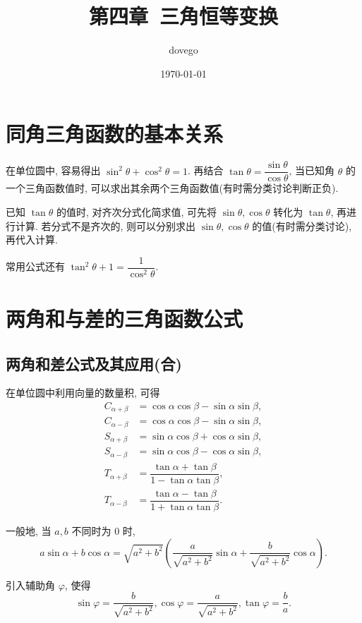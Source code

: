 \documentclass[titlepage]{ctexart}
\title{第四章~三角恒等变换}
\author{dovego}
\date{\today}
\begin{document}
\maketitle


\section{同角三角函数的基本关系}

在单位圆中, 容易得出 $\sin^2 \theta + \cos^2 \theta = 1$.
再结合 $\tan \theta = \dfrac{\sin \theta}{\cos \theta}$,
当已知角 $\theta$ 的一个三角函数值时, 可以求出其余两个三角函数值(有时需分类讨论判断正负).

已知 $\tan \theta$ 的值时, 对齐次分式化简求值, 可先将 $\sin \theta, \cos \theta$ 转化为 $\tan \theta$, 再进行计算.
若分式不是齐次的, 则可以分别求出 $\sin \theta, \cos \theta$ 的值(有时需分类讨论), 再代入计算.

常用公式还有 $\tan^2 \theta + 1 = \dfrac{1}{\cos^2 \theta}$.


\section{两角和与差的三角函数公式}

\subsection{两角和差公式及其应用(合)}
在单位圆中利用向量的数量积, 可得
\begin{align*}
C_{\alpha + \beta} &= \cos \alpha \cos \beta - \sin \alpha \sin \beta, \\
C_{\alpha - \beta} &= \cos \alpha \cos \beta - \sin \alpha \sin \beta, \\
S_{\alpha + \beta} &= \sin \alpha \cos \beta + \cos \alpha \sin \beta, \\
S_{\alpha - \beta} &= \sin \alpha \cos \beta - \cos \alpha \sin \beta, \\
T_{\alpha + \beta} &= \dfrac{\tan \alpha + \tan \beta}{1 - \tan \alpha \tan \beta}, \\
T_{\alpha - \beta} &= \dfrac{\tan \alpha - \tan \beta}{1 + \tan \alpha \tan \beta}.
\end{align*}

一般地, 当 $a, b$ 不同时为 0 时, 
\[
a\sin \alpha + b\cos \alpha = \sqrt{a^2 + b^2}(\frac{a}{\sqrt{a^2 + b^2}}\sin \alpha 
                                    + \frac{b}{\sqrt{a^2 + b^2}}\cos \alpha).
\]

引入辅助角 $\varphi$, 使得
\[
\sin \varphi = \frac{b}{\sqrt{a^2 + b^2}}, \cos \varphi = \frac{a}{\sqrt{a^2 + b^2}},
\tan \varphi = \frac{b}{a}.
\]
\end{document}
